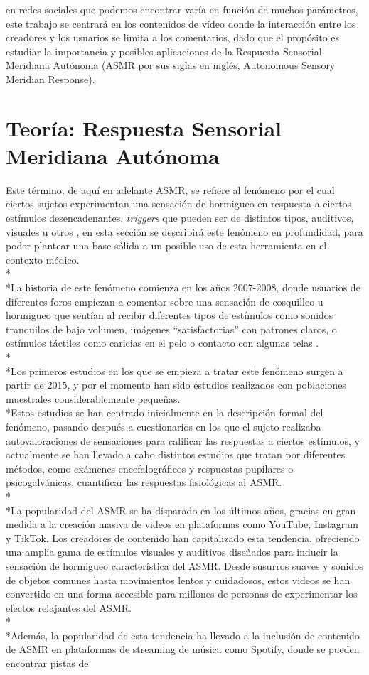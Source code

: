 \documentclass[a4paper,12pt,twoside]{memoir}
\begin{document}
\begin{itemize}
en redes sociales que podemos encontrar varía en función de muchos parámetros,  este trabajo se centrará en los contenidos de vídeo donde la interacción entre los creadores y los usuarios se limita a los comentarios, dado que el propósito es estudiar la importancia y posibles aplicaciones de la Respuesta Sensorial Meridiana Autónoma (ASMR por sus siglas en inglés, Autonomous Sensory Meridian Response). 

    \section{Teoría: Respuesta Sensorial Meridiana Autónoma}
    \text Este término, de aquí en adelante ASMR, se refiere al fenómeno por el cual ciertos sujetos experimentan una sensación de hormigueo en respuesta a ciertos estímulos desencadenantes, \textit{triggers} que pueden ser de distintos tipos, auditivos, visuales u otros \cite{mahady2023}, en esta sección se describirá este fenómeno en profundidad, para poder plantear una base sólida a un posible uso de esta herramienta en el contexto médico.\\*\\*La historia de este fenómeno comienza en los años 2007-2008, donde usuarios de diferentes foros empiezan a comentar sobre una sensación de cosquilleo u hormigueo que sentían al recibir diferentes tipos de estímulos como sonidos tranquilos de bajo volumen, imágenes “satisfactorias” con patrones claros, o estímulos táctiles como caricias en el pelo o contacto con algunas telas \cite{marcin2022asmr}. \\*\\*Los primeros estudios en los que se empieza a tratar este fenómeno surgen a partir de 2015, y por el momento han sido estudios realizados con poblaciones muestrales considerablemente pequeñas. \\*Estos estudios se han centrado inicialmente en la descripción formal del fenómeno, pasando después a cuestionarios en los que el sujeto realizaba autovaloraciones de sensaciones para calificar las respuestas a ciertos estímulos, y actualmente se han llevado a cabo distintos estudios que tratan por diferentes métodos, como exámenes encefalográficos y respuestas pupilares o psicogalvánicas, cuantificar las respuestas fisiológicas al ASMR.\\*\\*La popularidad del ASMR se ha disparado en los últimos años, gracias en gran medida a la creación masiva de videos en plataformas como YouTube, Instagram y TikTok. Los creadores de contenido han capitalizado esta tendencia, ofreciendo una amplia gama de estímulos visuales y auditivos diseñados para inducir la sensación de hormigueo característica del ASMR. Desde susurros suaves y sonidos de objetos comunes hasta movimientos lentos y cuidadosos, estos videos se han convertido en una forma accesible para millones de personas de experimentar los efectos relajantes del ASMR. \\*\\*Además, la popularidad de esta tendencia ha llevado a la inclusión de contenido de ASMR en plataformas de streaming de música como Spotify, donde se pueden encontrar pistas de 
\end{itemize}
\end{document}
